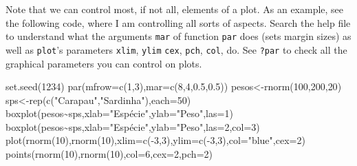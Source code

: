 \documentclass[
  letterpaper,
  DIV=11,
  numbers=noendperiod]{scrartcl}
\newenvironment{Shaded}{\begin{snugshade}}{\end{snugshade}}
\newcommand{\AttributeTok}[1]{\textcolor[rgb]{0.40,0.45,0.13}{#1}}
\newcommand{\DecValTok}[1]{\textcolor[rgb]{0.68,0.00,0.00}{#1}}
\newcommand{\FloatTok}[1]{\textcolor[rgb]{0.68,0.00,0.00}{#1}}
\newcommand{\FunctionTok}[1]{\textcolor[rgb]{0.28,0.35,0.67}{#1}}
\newcommand{\NormalTok}[1]{\textcolor[rgb]{0.00,0.23,0.31}{#1}}
\newcommand{\OtherTok}[1]{\textcolor[rgb]{0.00,0.23,0.31}{#1}}
\newcommand{\SpecialCharTok}[1]{\textcolor[rgb]{0.37,0.37,0.37}{#1}}
\newcommand{\StringTok}[1]{\textcolor[rgb]{0.13,0.47,0.30}{#1}}
\begin{document}
Note that we can control most, if not all, elements of a plot. As an
example, see the following code, where I am controlling all sorts of
aspects. Search the help file to understand what the arguments
\texttt{mar} of function \texttt{par} does (sets margin sizes) as well
as \texttt{plot}'s parameters \texttt{xlim}, \texttt{ylim} \texttt{cex},
\texttt{pch}, \texttt{col}, do. See \texttt{?par} to check all the
graphical parameters you can control on plots.

\begin{Shaded}
\begin{Highlighting}[]
\FunctionTok{set.seed}\NormalTok{(}\DecValTok{1234}\NormalTok{)}
\FunctionTok{par}\NormalTok{(}\AttributeTok{mfrow=}\FunctionTok{c}\NormalTok{(}\DecValTok{1}\NormalTok{,}\DecValTok{3}\NormalTok{),}\AttributeTok{mar=}\FunctionTok{c}\NormalTok{(}\DecValTok{8}\NormalTok{,}\DecValTok{4}\NormalTok{,}\FloatTok{0.5}\NormalTok{,}\FloatTok{0.5}\NormalTok{))}
\NormalTok{pesos}\OtherTok{\textless{}{-}}\FunctionTok{rnorm}\NormalTok{(}\DecValTok{100}\NormalTok{,}\DecValTok{200}\NormalTok{,}\DecValTok{20}\NormalTok{)}
\NormalTok{sps}\OtherTok{\textless{}{-}}\FunctionTok{rep}\NormalTok{(}\FunctionTok{c}\NormalTok{(}\StringTok{"Carapau"}\NormalTok{,}\StringTok{"Sardinha"}\NormalTok{),}\AttributeTok{each=}\DecValTok{50}\NormalTok{)}
\FunctionTok{boxplot}\NormalTok{(pesos}\SpecialCharTok{\textasciitilde{}}\NormalTok{sps,}\AttributeTok{xlab=}\StringTok{"Espécie"}\NormalTok{,}\AttributeTok{ylab=}\StringTok{"Peso"}\NormalTok{,}\AttributeTok{las=}\DecValTok{1}\NormalTok{)}
\FunctionTok{boxplot}\NormalTok{(pesos}\SpecialCharTok{\textasciitilde{}}\NormalTok{sps,}\AttributeTok{xlab=}\StringTok{"Espécie"}\NormalTok{,}\AttributeTok{ylab=}\StringTok{"Peso"}\NormalTok{,}\AttributeTok{las=}\DecValTok{2}\NormalTok{,}\AttributeTok{col=}\DecValTok{3}\NormalTok{)}
\FunctionTok{plot}\NormalTok{(}\FunctionTok{rnorm}\NormalTok{(}\DecValTok{10}\NormalTok{),}\FunctionTok{rnorm}\NormalTok{(}\DecValTok{10}\NormalTok{),}\AttributeTok{xlim=}\FunctionTok{c}\NormalTok{(}\SpecialCharTok{{-}}\DecValTok{3}\NormalTok{,}\DecValTok{3}\NormalTok{),}\AttributeTok{ylim=}\FunctionTok{c}\NormalTok{(}\SpecialCharTok{{-}}\DecValTok{3}\NormalTok{,}\DecValTok{3}\NormalTok{),}\AttributeTok{col=}\StringTok{"blue"}\NormalTok{,}\AttributeTok{cex=}\DecValTok{2}\NormalTok{)}
\FunctionTok{points}\NormalTok{(}\FunctionTok{rnorm}\NormalTok{(}\DecValTok{10}\NormalTok{),}\FunctionTok{rnorm}\NormalTok{(}\DecValTok{10}\NormalTok{),}\AttributeTok{col=}\DecValTok{6}\NormalTok{,}\AttributeTok{cex=}\DecValTok{2}\NormalTok{,}\AttributeTok{pch=}\DecValTok{2}\NormalTok{)}

\end{Highlighting}
\end{Shaded}
\end{document}
